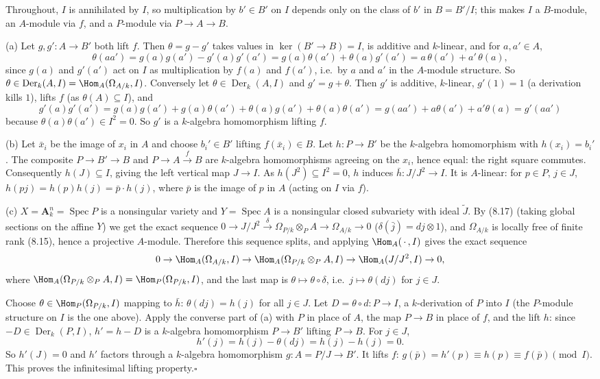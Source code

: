 \documentclass[11pt]{article}
\begin{document}
\pf
Throughout, $I$ is annihilated by $I$, so multiplication by $b'\in B'$ on $I$ depends only on the class of $b'$ in $B=B'/I$; this makes $I$ a $B$-module, an $A$-module via $f$, and a $P$-module via $P\to A\to B$.

(a) Let $g,g':A\to B'$ both lift $f$. Then $\theta=g-g'$ takes values in $\ker(B'\to B)=I$, is additive and $k$-linear, and for $a,a'\in A$,
\[\theta(aa')=g(a)g(a')-g'(a)g'(a')=g(a)\theta(a')+\theta(a)g'(a')=a\,\theta(a')+a'\,\theta(a),\]
since $g(a)$ and $g'(a')$ act on $I$ as multiplication by $f(a)$ and $f(a')$, i.e.\ by $a$ and $a'$ in the $A$-module structure. So $\theta\in\operatorname{Der}_k(A,I)=\Hom_A(\Omega_{A/k},I)$. Conversely let $\theta\in\operatorname{Der}_k(A,I)$ and $g'=g+\theta$. Then $g'$ is additive, $k$-linear, $g'(1)=1$ (a derivation kills $1$), lifts $f$ (as $\theta(A)\subseteq I$), and
\[g'(a)g'(a')=g(a)g(a')+g(a)\theta(a')+\theta(a)g(a')+\theta(a)\theta(a')=g(aa')+a\theta(a')+a'\theta(a)=g'(aa')\]
because $\theta(a)\theta(a')\in I^2=0$. So $g'$ is a $k$-algebra homomorphism lifting $f$.

(b) Let $\bar x_i$ be the image of $x_i$ in $A$ and choose $b_i'\in B'$ lifting $f(\bar x_i)\in B$. Let $h:P\to B'$ be the $k$-algebra homomorphism with $h(x_i)=b_i'$. The composite $P\to B'\to B$ and $P\to A\xrightarrow fB$ are $k$-algebra homomorphisms agreeing on the $x_i$, hence equal: the right square commutes. Consequently $h(J)\subseteq I$, giving the left vertical map $J\to I$. As $h(J^2)\subseteq I^2=0$, $h$ induces $\bar h:J/J^2\to I$. It is $A$-linear: for $p\in P$, $j\in J$, $h(pj)=h(p)h(j)=\bar p\cdot h(j)$, where $\bar p$ is the image of $p$ in $A$ (acting on $I$ via $f$).

(c) $X=\mathbf A^n_k=\operatorname{Spec}P$ is a nonsingular variety and $Y=\operatorname{Spec}A$ is a nonsingular closed subvariety with ideal $\widetilde J$. By (8.17) (taking global sections on the affine $Y$) we get the exact sequence $0\to J/J^2\xrightarrow{\ \delta\ }\Omega_{P/k}\otimes_PA\to\Omega_{A/k}\to0$ ($\delta(\bar j)=dj\otimes1$), and $\Omega_{A/k}$ is locally free of finite rank (8.15), hence a projective $A$-module. Therefore this sequence splits, and applying $\Hom_A(\,\cdot\,,I)$ gives the exact sequence
\[0\to\Hom_A(\Omega_{A/k},I)\to\Hom_A(\Omega_{P/k}\otimes_PA,I)\to\Hom_A(J/J^2,I)\to0,\]
where $\Hom_A(\Omega_{P/k}\otimes_PA,I)=\Hom_P(\Omega_{P/k},I)$, and the last map is $\theta\mapsto\theta\circ\delta$, i.e.\ $j\mapsto\theta(dj)$ for $j\in J$.

Choose $\theta\in\Hom_P(\Omega_{P/k},I)$ mapping to $\bar h$: $\theta(dj)=h(j)$ for all $j\in J$. Let $D=\theta\circ d:P\to I$, a $k$-derivation of $P$ into $I$ (the $P$-module structure on $I$ is the one above). Apply the converse part of (a) with $P$ in place of $A$, the map $P\to B$ in place of $f$, and the lift $h$: since $-D\in\operatorname{Der}_k(P,I)$, $h'=h-D$ is a $k$-algebra homomorphism $P\to B'$ lifting $P\to B$. For $j\in J$,
\[h'(j)=h(j)-\theta(dj)=h(j)-h(j)=0.\]
So $h'(J)=0$ and $h'$ factors through a $k$-algebra homomorphism $g:A=P/J\to B'$. It lifts $f$: $g(\bar p)=h'(p)\equiv h(p)\equiv f(\bar p)\pmod I$. This proves the infinitesimal lifting property.\hfill$\square$
\end{document}
